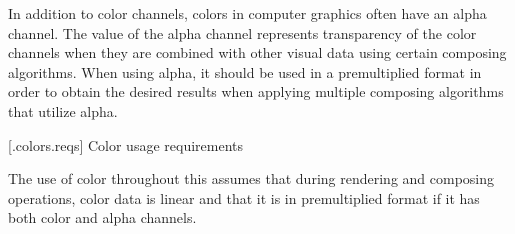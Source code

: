\pnum
In addition to color channels, colors in computer graphics often have an alpha channel. The value of the alpha channel represents transparency of the color channels when they are combined with other visual data using certain composing algorithms. When using alpha, it should be used in a premultiplied format in order to obtain the desired results when applying multiple composing algorithms that utilize alpha.

 [\iotwod.colors.reqs] {Color usage requirements}

\pnum
The use of color throughout this \documenttypename assumes that during rendering and composing operations, color data is linear and that it is in premultiplied format if it has both color and alpha channels.

\addtocounter{SectionDepthBase}{1}

\addtocounter{SectionDepthBase}{-1}
